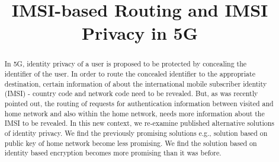 \documentclass[conference]{IEEEtran}
\begin{document}
\title{IMSI-based Routing and IMSI Privacy in 5G}
\date{}%

\author{
\and
{}
}
\maketitle

\begin{abstract}
In 5G, identity privacy of a user is proposed to be protected by concealing the identifier of the user. In order to route the concealed identifier to the appropriate destination, certain information of about the international mobile subscriber identity (IMSI) - country code and network code need to be revealed. But, as was recently pointed out, the routing of requests for authentication information between visited and home network and also within the home network, needs more information about the IMSI to be revealed. In this new context, we re-examine published alternative solutions of identity privacy. We find the previously promising solutions e.g., solution based on public key of home network become less promising. We find the solution based on identity based encryption becomes more promising than it was before.
\end{abstract}
\end{document}
